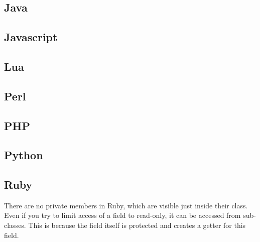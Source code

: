 \documentclass{KodeBook}
\begin{document}
%

\subsection{Java}

%

\subsection{Javascript} 

%
%
%


\subsection{Lua}


\subsection{Perl}

%

\subsection{PHP}

%

\subsection{Python}

%

\subsection{Ruby}

There are no private members in Ruby, which are visible just inside their class. 
Even if you try to limit access of a field to read-only, it can be accessed from sub-classes. 
This is because the field itself is protected and  creates a getter for this field. 
\end{document}
